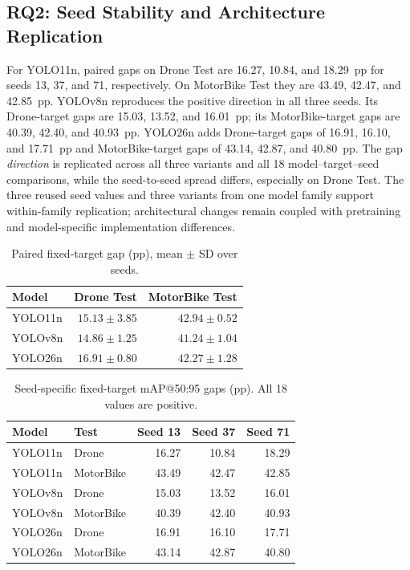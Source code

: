 \documentclass[conference,a4paper]{IEEEtran}
\begin{document}
\subsection{RQ2: Seed Stability and Architecture Replication}
For YOLO11n, paired gaps on Drone Test are 16.27, 10.84, and 18.29~pp for seeds 13, 37, and 71, respectively. On MotorBike Test they are 43.49, 42.47, and 42.85~pp. YOLOv8n reproduces the positive direction in all three seeds. Its Drone-target gaps are 15.03, 13.52, and 16.01~pp; its MotorBike-target gaps are 40.39, 42.40, and 40.93~pp. YOLO26n adds Drone-target gaps of 16.91, 16.10, and 17.71~pp and MotorBike-target gaps of 43.14, 42.87, and 40.80~pp. The gap \emph{direction} is replicated across all three variants and all 18 model--target--seed comparisons, while the seed-to-seed spread differs, especially on Drone Test. The three reused seed values and three variants from one model family support within-family replication; architectural changes remain coupled with pretraining and model-specific implementation differences.

\begin{table}[t]
\centering\caption{Paired fixed-target gap (pp), mean $\pm$ SD over seeds.}\label{tab:paired}
\begin{tabular}{lrr}\toprule
Model & Drone Test & MotorBike Test\\\midrule
YOLO11n & $15.13\pm3.85$ & $42.94\pm0.52$ \\
YOLOv8n & $14.86\pm1.25$ & $41.24\pm1.04$ \\
YOLO26n & $16.91\pm0.80$ & $42.27\pm1.28$ \\
\bottomrule
\end{tabular}
\end{table}

\begin{table}[t]
\centering\caption{Seed-specific fixed-target mAP@50:95 gaps (pp). All 18 values are positive.}\label{tab:seeds}
\begin{tabular}{llrrr}\toprule
Model & Test & Seed 13 & Seed 37 & Seed 71\\\midrule
YOLO11n & Drone & 16.27 & 10.84 & 18.29 \\
YOLO11n & MotorBike & 43.49 & 42.47 & 42.85 \\
YOLOv8n & Drone & 15.03 & 13.52 & 16.01 \\
YOLOv8n & MotorBike & 40.39 & 42.40 & 40.93 \\
YOLO26n & Drone & 16.91 & 16.10 & 17.71 \\
YOLO26n & MotorBike & 43.14 & 42.87 & 40.80 \\
\bottomrule
\end{tabular}
\end{table}
\end{document}
